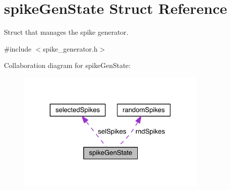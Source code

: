 \hypertarget{structspike_gen_state}{}\section{spike\+Gen\+State Struct Reference}
\label{structspike_gen_state}


Struct that manages the spike generator.  




{\ttfamily \#include $<$spike\+\_\+generator.\+h$>$}



Collaboration diagram for spike\+Gen\+State\+:\nopagebreak
\begin{figure}[H]
\begin{center}
\leavevmode
\includegraphics[width=262pt]{structspike_gen_state__coll__graph}
\end{center}
\end{figure}
